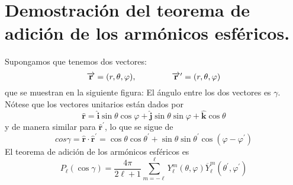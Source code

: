 \section*{Demostración del teorema de adición de los armónicos esféricos.}
Supongamos que tenemos dos vectores:
\[ \overrightarrow{\mathbf{r}} =(r, \theta, \varphi), \hspace{1.5cm} \overrightarrow{\mathbf{r}}^{\prime} =(r, \theta, \varphi)  \]
que se muestran en la siguiente figura:
El ángulo entre los dos vectores es $\gamma$. Nótese que los vectores unitarios están dados por
\[ \widehat{\mathbf{r}} = \widehat{\mathbf{i}} \sin \theta \cos \varphi + \widehat{\mathbf{j}} \sin \theta \sin \varphi + \widehat{\mathbf{k}} \cos \theta \]
y de manera similar para $\widehat{\mathbf{r}}^{\prime}$, lo que se sigue de
\begin{equation}
cos \gamma = \widehat{\mathbf{r}} \cdot \widehat{\mathbf{r}}^{\prime} = \cos \theta \cos \theta^{\prime} + \sin \theta \sin \theta^{\prime} \cos (\varphi -  \varphi^{\prime})
\label{eq:ecuacion_021}
\end{equation}
El teorema de adición de los armónicos esféricos es
\[ P_{\ell} (\cos \gamma) = \dfrac{4 \pi}{2 \ell + 1} \sum_{m= -\ell}^{\ell} Y_{\ell}^{m} (\theta, \varphi) \overline{Y}_{\ell}^{m} (\theta^{\prime}, \varphi^{\prime}) \]


